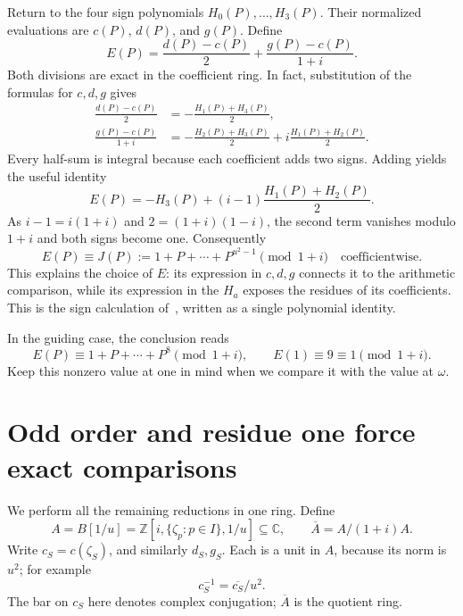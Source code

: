 \documentclass[11pt]{article}
\begin{document}
Return to the four sign polynomials $H_{0}(P),\ldots,H_{3}(P)$.
Their normalized evaluations are $c(P)$, $d(P)$, and $g(P)$.
Define
\begin{equation}
 E(P)=\frac{d(P)-c(P)}2+\frac{g(P)-c(P)}{1+i}.%
 \label{eq:late-E}
\end{equation}
Both divisions are exact in the coefficient ring. In fact, substitution
of the formulas for $c,d,g$ gives
\begin{align*}
 \frac{d(P)-c(P)}2&=-\frac{H_{1}(P)+H_{3}(P)}2,\\
 \frac{g(P)-c(P)}{1+i}
 &=-\frac{H_{2}(P)+H_{3}(P)}2
     +i\frac{H_{1}(P)+H_{2}(P)}2.
\end{align*}
Every half-sum is integral because each coefficient adds two signs.
Adding yields the useful identity
\begin{equation}
 E(P)=-H_{3}(P)+(i-1)\frac{H_{1}(P)+H_{2}(P)}2.%
 \label{eq:late-E-signs}
\end{equation}
As $i-1=i(1+i)$ and $2=(1+i)(1-i)$, the second term vanishes modulo $1+i$
and both signs become one. Consequently
\begin{equation}
 E(P)\equiv J(P):=1+P+\cdots+P^{u^{2}-1}\pmod{1+i}
 \quad\text{coefficientwise}.%
 \label{eq:late-all-ones}
\end{equation}
This explains the choice of $E$: its expression in $c,d,g$ connects it
to the arithmetic comparison, while its expression in the $H_{a}$ exposes
the residues of its coefficients. This is the sign calculation of~\cite[Section~4]{circulant-source}, written as a single polynomial identity.

In the guiding case, the conclusion reads
\[
 E(P)\equiv1+P+\cdots+P^8\pmod{1+i},
 \qquad E(1)\equiv9\equiv1\pmod{1+i}.
\]
Keep this nonzero value at one in mind when we compare it with the value
at $\omega$.

\section{Odd order and residue one force exact comparisons}%
\label{sec:late-rigidity}

We perform all the remaining reductions in one ring. Define
\[
 A=B[1/u]=\mathbb Z[i,\{\zeta_{p}:p\in I\},1/u]\subseteq\mathbb C,
 \qquad \overline A=A/(1+i)A.
\]
Write $c_{S}=c(\zeta_{S})$, and similarly $d_{S},g_{S}$. Each is a unit in
$A$, because its norm is $u^{2}$; for example
\begin{equation}
 c_{S}^{-1}=\overline{c_{S}}/u^{2}.%
 \label{eq:late-unit-inverse}
\end{equation}
The bar on $c_{S}$ here denotes complex conjugation; $\overline A$ is
the quotient ring.
\end{document}

